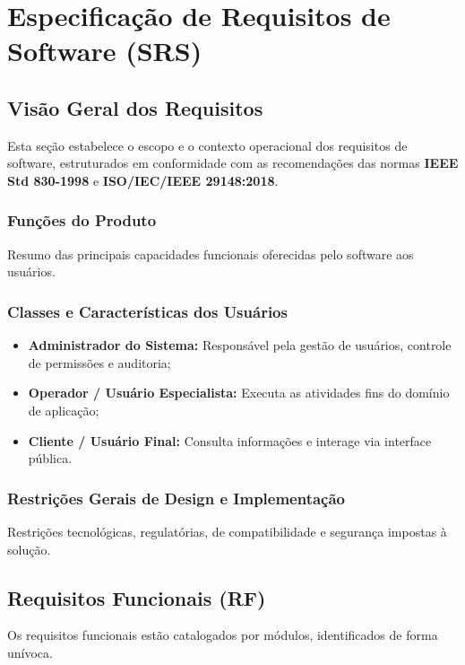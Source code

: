 \chapter{Especificação de Requisitos de Software (SRS)}
\label{chap:especificacao_requisitos}

\section{Visão Geral dos Requisitos}
Esta seção estabelece o escopo e o contexto operacional dos requisitos de software, estruturados em conformidade com as recomendações das normas \textbf{IEEE Std 830-1998} e \textbf{ISO/IEC/IEEE 29148:2018}.

\subsection{Funções do Produto}
Resumo das principais capacidades funcionais oferecidas pelo software aos usuários.

\subsection{Classes e Características dos Usuários}
\begin{itemize}
    \item \textbf{Administrador do Sistema:} Responsável pela gestão de usuários, controle de permissões e auditoria;
    \item \textbf{Operador / Usuário Especialista:} Executa as atividades fins do domínio de aplicação;
    \item \textbf{Cliente / Usuário Final:} Consulta informações e interage via interface pública.
\end{itemize}

\subsection{Restrições Gerais de Design e Implementação}
Restrições tecnológicas, regulatórias, de compatibilidade e segurança impostas à solução.

\section{Requisitos Funcionais (RF)}
Os requisitos funcionais estão catalogados por módulos, identificados de forma unívoca.

